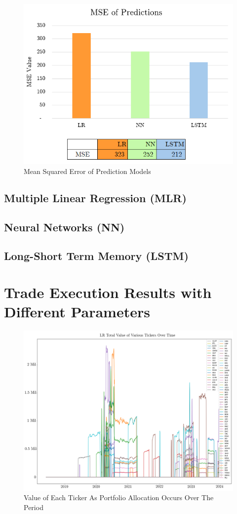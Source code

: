 \documentclass[a4paper,12pt]{report}
\numberwithin{equation}{section}
\theoremstyle{definition}
\begin{document}
\begin{figure}[H]
  \centerline{\includegraphics[width=13cm]{MSE of ML models}}
  \caption{Mean Squared Error of Prediction Models}
  \label{fig:MSE_ML}
\end{figure}

\subsection{Multiple Linear Regression (MLR)}
\subsection{Neural Networks (NN)}
\subsection{Long-Short Term Memory (LSTM)}
\section{Trade Execution Results with Different Parameters}

\begin{figure}[H]
  \centerline{\includegraphics[width=20cm]{ML_portfolio_value_movement}}
  \caption{Value of Each Ticker As Portfolio Allocation Occurs Over The Period}
  \label{fig:portfolio_movement}
\end{figure}
\end{document}

